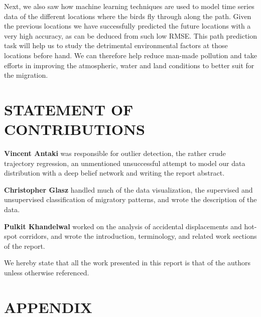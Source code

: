 \documentclass[letterpaper, 10pt, conference]{ieeeconf}  %
\begin{document}
	Next, we also saw how machine learning techniques are used to model time series data of the different locations where the birds fly through along the path. Given the previous locations we have successfully predicted the future locations with a very high accuracy, as can be deduced from such low RMSE. This path prediction task will help us to study the detrimental environmental factors at those locations before hand. We can therefore help reduce man-made pollution and take efforts in improving the atmospheric, water and land conditions to better suit for the migration. 
    

\section*{STATEMENT OF CONTRIBUTIONS}
\textbf{Vincent Antaki} was responsible for outlier detection, the rather crude trajectory regression, an unmentioned unsuccessful attempt to model our data distribution with a deep belief network and writing the report abstract.

\textbf{Christopher Glasz} handled much of the data visualization, the supervised and unsupervised classification of migratory patterns, and wrote the description of the data.

\textbf{Pulkit Khandelwal} worked on the analysis of accidental displacements and hot-spot corridors, and wrote the introduction, terminology, and related work sections of the report.

We hereby state that all the work presented in this report is that of the authors unless otherwise referenced.





\printbibliography

\newpage
\section*{APPENDIX}
\end{document}

